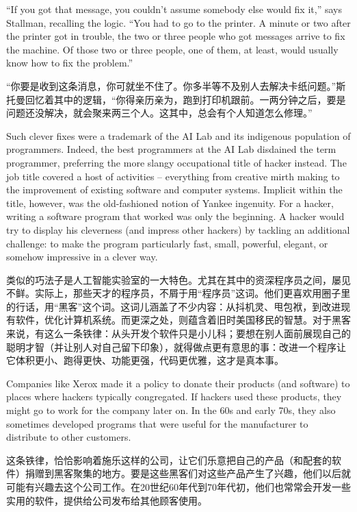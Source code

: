\ifdefined\eng
``If you got that message, you couldn't assume somebody else would fix it,'' says Stallman, recalling the logic. ``You had to go to the printer. A minute or two after the printer got in trouble, the two or three people who got messages arrive to fix the machine. Of those two or three people, one of them, at least, would usually know how to fix the problem.''
\fi

\ifdefined\chs
“你要是收到这条消息，你可就坐不住了。你多半等不及别人去解决卡纸问题。”斯托曼回忆着其中的逻辑，“你得亲历亲为，跑到打印机跟前。一两分钟之后，要是问题还没解决，就会聚来两三个人。这其中，总会有个人知道怎么修理。”
\fi

\ifdefined\eng
Such clever fixes were a trademark of the AI Lab and its indigenous population of programmers. Indeed, the best programmers at the AI Lab disdained the term programmer, preferring the more slangy occupational title of hacker instead. The job title covered a host of activities -- everything from creative mirth making to the improvement of existing software and computer systems. Implicit within the title, however, was the old-fashioned notion of Yankee ingenuity. For a hacker, writing a software program that worked was only the beginning. A hacker would try to display his cleverness (and impress other hackers) by tackling an additional challenge: to make the program particularly fast, small, powerful, elegant, or somehow impressive in a clever way.
\fi

\ifdefined\chs
类似的巧法子是人工智能实验室的一大特色。尤其在其中的资深程序员之间，屡见不鲜。实际上，那些天才的程序员，不屑于用“程序员”这词。他们更喜欢用圈子里的行话，用“黑客”这个词。这词儿涵盖了不少内容：从抖机灵、甩包袱，到改进现有软件，优化计算机系统。而更深之处，则蕴含着旧时美国移民的智慧。对于黑客来说，有这么一条铁律：从头开发个软件只是小儿科；要想在别人面前展现自己的聪明才智（并让别人对自己留下印象），就得做点更有意思的事：改进一个程序让它体积更小、跑得更快、功能更强，代码更优雅，这才是真本事。
\fi

\ifdefined\eng
Companies like Xerox made it a policy to donate their products (and software) to places where hackers typically congregated. If hackers used these products, they might go to work for the company later on.  In the 60s and early 70s, they also sometimes developed programs that were useful for the manufacturer to distribute to other customers.
\fi

\ifdefined\chs
这条铁律，恰恰影响着施乐这样的公司，让它们乐意把自己的产品（和配套的软件）捐赠到黑客聚集的地方。要是这些黑客们对这些产品产生了兴趣，他们以后就可能有兴趣去这个公司工作。在20世纪60年代到70年代初，他们也常常会开发一些实用的软件，提供给公司发布给其他顾客使用。
\fi

